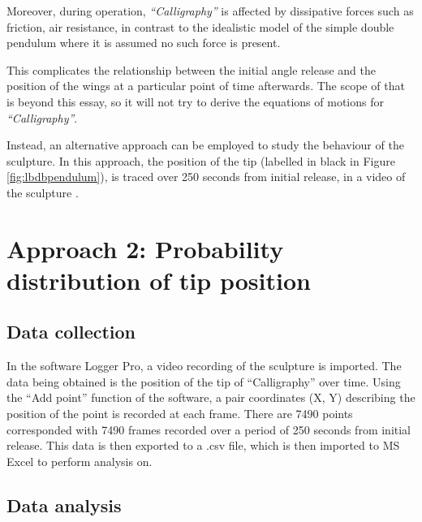 \documentclass[a4paper,12pt]{article}
\begin{document}
Moreover, during operation, \textit{“Calligraphy”} is affected by dissipative forces such as friction, air resistance, in contrast to the idealistic model of the simple double pendulum where it is assumed no such force is present.

This complicates the relationship between the initial angle release and the position of the wings at a particular point of time afterwards. The scope of that is beyond this essay, so it will not try to derive the equations of motions for \textit{“Calligraphy”}. 

Instead, an alternative approach can be employed to study the behaviour of the sculpture. In this approach, the position of the tip (labelled in black in Figure \ref{fig:lbdbpendulum}), is traced over 250 seconds from initial release, in a video of the sculpture \cite{roy-2021}.

\section{Approach 2: Probability distribution of tip position}
\subsection{Data collection}

In the software Logger Pro, a video recording of the sculpture \cite{roy-2021} is imported. The data being obtained is the position of the tip of “Calligraphy” over time. Using the “Add point” function of the software, a pair coordinates (X, Y) describing the position of the point is recorded at each frame. There are 7490 points corresponded with 7490 frames recorded over a period of 250 seconds from initial release. This data is then exported to a .csv file, which is then imported to MS Excel to perform analysis on.

\subsection{Data analysis}
\end{document}
